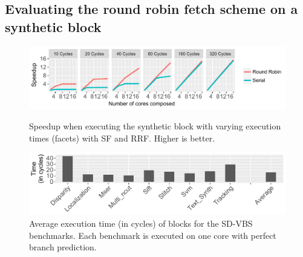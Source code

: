 \subsection{Evaluating the round robin fetch scheme on a synthetic block}

\begin{figure}[t]
    \centering
    \includegraphics[width=1\textwidth]{chapter3/graphics/motivation_fetch2.pdf}
   	\vspace{-2em}
 \caption{Speedup when executing the synthetic block with varying execution times (facets) with SF and RRF. Higher is better.}
    \label{fig:motiv_res}
    \centering
    \includegraphics[width=1\textwidth]{chapter3/graphics/sdvbsav.pdf}
    
	\vspace{-0.5em}
	\caption{Average execution time (in cycles) of blocks for the SD-VBS benchmarks. Each benchmark is executed on one core with perfect branch prediction.}
	
    \label{fig:svdbs_av}
\vspace{1em}
\end{figure}

